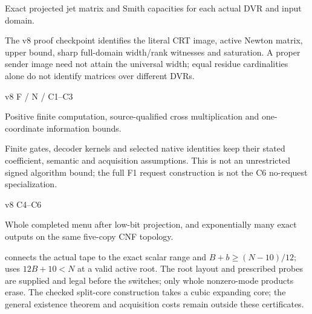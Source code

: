 \documentclass[11pt,a4paper]{article}
\newlength{\OfflineResearchTableWidth}
\newcommand{\OfflineResearchRow}{\par}
\newenvironment{OfflineResearchTable}{%
  \par\medskip\begingroup\small\setlength{\parindent}{0pt}%
  \setlength{\parskip}{3pt plus 1pt minus .5pt}%
  \setlength{\OfflineResearchTableWidth}{\linewidth}%
}{%
  \par\endgroup\medskip%
}
\begin{document}
\begin{OfflineResearchTable}
\begin{minipage}[t]{0.31165\OfflineResearchTableWidth}
Exact projected jet matrix and Smith capacities for each actual DVR and input domain.
\end{minipage}\hfill%
\begin{minipage}[t]{0.49261\OfflineResearchTableWidth}\raggedright
The v8 proof checkpoint identifies the literal CRT image, active Newton matrix, upper bound, sharp full-domain width/rank witnesses and saturation. A proper sender image need not attain the universal width; equal residue cardinalities alone do not identify matrices over different DVRs.
\end{minipage}%
\OfflineResearchRow
\noindent%
\begin{minipage}[t]{0.14074\OfflineResearchTableWidth}\raggedright
v8 F / N / C1--C3
\end{minipage}\hfill%
\begin{minipage}[t]{0.31165\OfflineResearchTableWidth}\raggedright
Positive finite computation, source-qualified cross multiplication and one-coordinate information bounds.
\end{minipage}\hfill%
\begin{minipage}[t]{0.49261\OfflineResearchTableWidth}\raggedright
Finite gates, decoder kernels and selected native identities keep their stated coefficient, semantic and acquisition assumptions. This is not an unrestricted signed algorithm bound; the full F1 request construction is not the C6 no-request specialization.
\end{minipage}%
\OfflineResearchRow
\noindent%
\begin{minipage}[t]{0.14074\OfflineResearchTableWidth}\raggedright
v8 C4--C6
\end{minipage}\hfill%
\begin{minipage}[t]{0.31165\OfflineResearchTableWidth}\raggedright
Whole completed menu after low-bit projection, and exponentially many exact outputs on the same five-copy CNF topology.
\end{minipage}\hfill%
\begin{minipage}[t]{0.49261\OfflineResearchTableWidth}\raggedright
{} connects the actual tape to the exact scalar range and \(B+b\ge(N-10)/12\);  uses \(12B+10<N\) at a valid active root. The root layout and prescribed probes are supplied and legal before the switches; only whole nonzero-mode products erase. The checked split-core construction takes a cubic expanding core; the general existence theorem and acquisition costs remain outside these certificates.
\end{minipage}%

\end{OfflineResearchTable}
\end{document}
